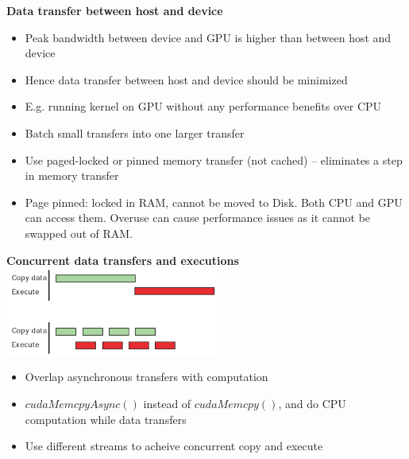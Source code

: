 \documentclass[10pt, landscape]{article}
\begin{document}
\begin{multicols}{4}
\textbf{Data transfer between host and device}
\begin{itemize}
    \item Peak bandwidth between device and GPU is higher than between host and device 
    \item Hence data transfer between host and device should be minimized 
    \item E.g. running kernel on GPU without any performance benefits over CPU 
    \item Batch small transfers into one larger transfer 
    \item Use paged-locked or pinned memory transfer (not cached) -- eliminates a step in memory transfer 
    \item Page pinned: locked in RAM, cannot be moved to Disk. Both CPU and GPU can access them. Overuse can cause performance issues as it cannot be swapped out of RAM.
\end{itemize}

 
\textbf{Concurrent data transfers and executions}
\includegraphics*[width=7cm]{cuda_async.png}
\begin{itemize}
    \item Overlap asynchronous transfers with computation 
    \item $cudaMemcpyAsync()$ instead of $cudaMemcpy()$, and do CPU computation while data transfers 
    \item Use different streams to acheive concurrent copy and execute
\end{itemize}



\end{multicols}
\end{document}
